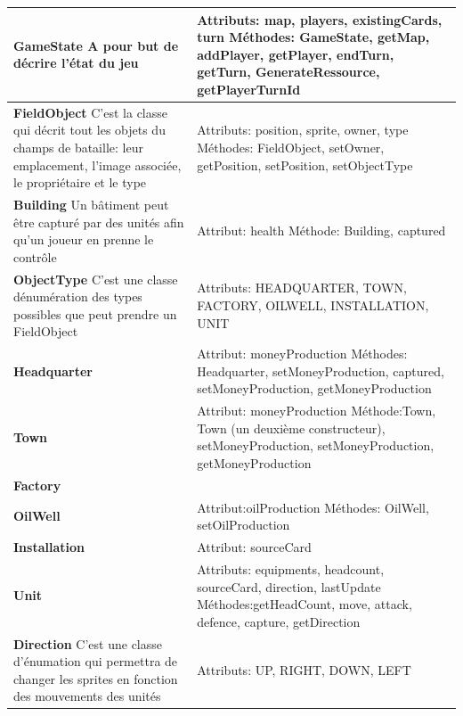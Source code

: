 \newpage
\phantom{Texte invisible parce que j'ai pas trouvé d'autre méthode pour mettre le tableau à la ligne.}

\begin{tabularx}{15 cm}{|X|X|}
\hline
\textbf{GameState} \newline A pour but de décrire l'état du jeu & Attributs: map, players, existingCards, turn \newline Méthodes: GameState, getMap, addPlayer, getPlayer, endTurn, getTurn, GenerateRessource, getPlayerTurnId\\ 
\hline
\textbf{FieldObject} \newline C'est la classe qui décrit tout les objets du champs de bataille: leur emplacement, l'image associée, le propriétaire et le type  & Attributs: position, sprite, owner, type \newline Méthodes: FieldObject, setOwner, getPosition, setPosition, setObjectType\\
\hline
\textbf{Building} \newline Un bâtiment peut être capturé par des unités afin qu'un joueur en prenne le contrôle & Attribut: health \newline Méthode: Building, captured\\
\hline
\textbf{ObjectType} \newline C'est une classe dénumération des types possibles que peut prendre un FieldObject & Attributs: HEADQUARTER, TOWN, FACTORY, OILWELL, INSTALLATION, UNIT \newline \\
\hline
\textbf{Headquarter} & Attribut: moneyProduction \newline Méthodes: Headquarter, setMoneyProduction, captured, setMoneyProduction, getMoneyProduction\\
\hline
\textbf{Town} & Attribut: moneyProduction \newline Méthode:Town, Town (un deuxième constructeur), setMoneyProduction, setMoneyProduction, getMoneyProduction\\
\hline
\textbf{Factory} &  
\newline\\
\hline
\textbf{OilWell} & Attribut:oilProduction \newline Méthodes: OilWell, setOilProduction\\
\hline
\textbf{Installation} & Attribut: sourceCard \newline\\
\hline
\textbf{Unit} & Attributs: equipments, headcount, sourceCard, direction, lastUpdate \newline Méthodes:getHeadCount, move, attack, defence, capture, getDirection\\

\hline
\textbf{Direction} \newline C'est une classe d'énumation qui permettra de changer les sprites en fonction des mouvements des unités & Attributs: UP, RIGHT, DOWN, LEFT \newline \\
\hline

\end{tabularx}



